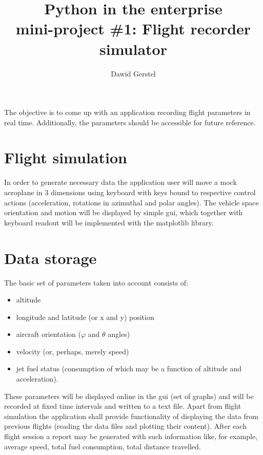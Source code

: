 \documentclass[a4paper,10pt]{article}
\title{\textbf{Python in the enterprise} \\ mini-project \#1: Flight recorder simulator}
\author{Dawid Gerstel}
\begin{document}
\maketitle

The objective is to come up with an application recording flight parameters in real time. Additionally, the parameters should be accessible for future reference. 

\section{Flight simulation}
In order to generate necessary data the application user will move a mock aeroplane in 3 dimensions using keyboard with keys bound to respective control actions (acceleration, rotations in azimuthal and polar angles). The vehicle space orientation and motion will be displayed by simple gui, which together with keyboard readout will be implemented with the matplotlib library.

\section{Data storage}
The basic set of parameters taken into account consists of:
\begin{itemize}
    \item altitude
    \item longitude and latitude (or x and y) position
    \item aircraft orientation ($\varphi$ and $\theta$ angles)
    \item velocity (or, perhaps, merely speed)
    \item jet fuel status (consumption of which may be a function of altitude and acceleration).
\end{itemize}
These parameters will be displayed online in the gui (set of graphs) and will be recorded at fixed time intervals and written to a text file.
Apart from flight simulation the application shall provide functionality of displaying the data from previous flights (reading the data files and plotting their content).
After each flight session a report may be generated with such information like, for example, average speed, total fuel consumption, total distance travelled.
\end{document}
